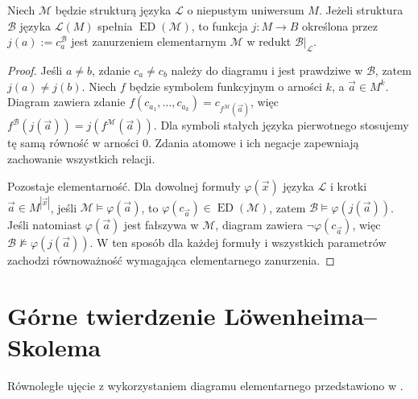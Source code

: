 \begin{lemat}
\label{lem:ls-diagram-embedding}
Niech $\mathcal M$ będzie strukturą języka
$\mathcal L$ o niepustym uniwersum $M$.
Jeżeli struktura $\mathcal B$ języka $\mathcal L(M)$
spełnia $\operatorname{ED}(\mathcal M)$,
to funkcja $j:M\to B$ określona przez
$j(a):=c_a^{\mathcal B}$
jest zanurzeniem elementarnym
$\mathcal M$ w redukt $\mathcal B|_{\mathcal L}$.
\end{lemat}
\begin{proof}
Jeśli $a\ne b$, zdanie $c_a\ne c_b$
należy do diagramu i jest prawdziwe w $\mathcal B$,
zatem $j(a)\ne j(b)$.
Niech $f$ będzie symbolem funkcyjnym
o arności $k$, a $\vec a\in M^k$.
Diagram zawiera zdanie
$f(c_{a_1},\ldots,c_{a_k})=
c_{f^{\mathcal M}(\vec a)}$,
więc
$f^{\mathcal B}(j(\vec a))=
j(f^{\mathcal M}(\vec a))$.
Dla symboli stałych języka pierwotnego
stosujemy tę samą równość w arności $0$.
Zdania atomowe i ich negacje zapewniają
zachowanie wszystkich relacji.

Pozostaje elementarność. Dla dowolnej formuły
$\varphi(\vec x)$ języka $\mathcal L$
i krotki $\vec a\in M^{|\vec x|}$,
jeśli $\mathcal M\models\varphi(\vec a)$,
to $\varphi(c_{\vec a})\in
\operatorname{ED}(\mathcal M)$,
zatem $\mathcal B\models\varphi(j(\vec a))$.
Jeśli natomiast $\varphi(\vec a)$ jest fałszywa
w $\mathcal M$, diagram zawiera
$\neg\varphi(c_{\vec a})$,
więc $\mathcal B\not\models\varphi(j(\vec a))$.
W ten sposób dla każdej formuły i wszystkich
parametrów zachodzi równoważność wymagająca
elementarnego zanurzenia.
\end{proof}

\section{Górne twierdzenie Löwenheima--Skolema}
Równoległe ujęcie z wykorzystaniem diagramu elementarnego przedstawiono w .

